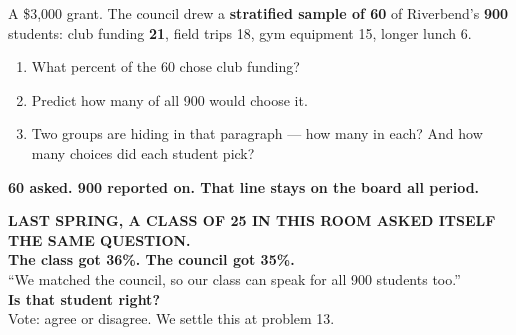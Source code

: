 \documentclass[aspectratio=169, 11pt]{beamer}
\begin{document}
\begin{frame}[t, plain]
  \vspace{0.25cm}
  \begin{center}
    \begin{minipage}{0.88\textwidth}
      A \$3{,}000 grant. The council drew a \textbf{stratified sample of 60} of Riverbend's
      \textbf{900} students: club funding \textbf{21}, field trips 18, gym equipment 15, longer
      lunch 6.
      \begin{enumerate}\setlength{\itemsep}{6pt}
        \item What percent of the 60 chose club funding?
        \item Predict how many of all 900 would choose it.
        \item Two groups are hiding in that paragraph --- how many in each? And how many choices
              did each student pick?
      \end{enumerate}
    \end{minipage}
  \end{center}
  \vspace{0.3cm}
  \begin{center}
    {\color{cerulean}\bfseries 60 asked. 900 reported on. That line stays on the board all period.}
  \end{center}
\end{frame}

{
\begin{frame}[plain]
  \vspace{1.1cm}
  \begin{center}
    {\color{frostmid}\bfseries\small LAST SPRING, A CLASS OF 25 IN THIS ROOM ASKED ITSELF THE SAME QUESTION.}\\[0.7cm]
    {\color{white}\bfseries\Large The class got 36\%. \quad The council got 35\%.}\\[0.6cm]
    {\color{white}\small ``We matched the council, so our class can speak for all 900 students too.''}\\[0.8cm]
    {\color{goldacc}\bfseries\large Is that student right?}\\[0.4cm]
    {\color{frostmid}\small Vote: agree or disagree. We settle this at problem 13.}
  \end{center}
\end{frame}
}
\end{document}
